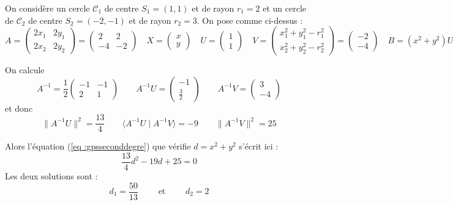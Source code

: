 \documentclass[class=report,crop=false]{standalone}
\begin{document}
\begin{exemple}
On considère un cercle $\mathcal{C}_1$ de centre $S_1 = (1,1)$ et de rayon $r_1=2$
et un cercle de $\mathcal{C}_2$ de centre $S_2 = (-2,-1)$ et de rayon $r_2=3$.
On pose comme ci-dessus :
$$
A = \begin{pmatrix}2x_1&2y_1\\2x_2&2y_2\end{pmatrix}
= \begin{pmatrix}2&2\\-4&-2\end{pmatrix}\quad
X = \begin{pmatrix}x\\y\end{pmatrix}\quad
U = \begin{pmatrix}1\\1\end{pmatrix} \quad
V = \begin{pmatrix}x_1^2 + y_1^2  - r_1^2\\x_2^2 + y_2^2  - r_2^2\end{pmatrix}
= \begin{pmatrix}-2\\-4\end{pmatrix}\quad
B = (x^2+y^2) U + V$$


On calcule 
$$A^{-1} = \frac12\begin{pmatrix}-1&-1\\2&1\end{pmatrix} \qquad
A^{-1}U = \begin{pmatrix}-1\\\frac32\end{pmatrix}\qquad
A^{-1}V = \begin{pmatrix}3\\-4\end{pmatrix}$$
et donc 
$$\|  A^{-1}  U  \|^2 = \frac{13}{4}\qquad
\langle  A^{-1}  U \mid A^{-1} V \rangle = -9\qquad
\| A^{-1} V \|^2= 25$$

Alors l'équation (\ref{eq :gpsseconddegre}) que vérifie $d=x^2+y^2$ s'écrit ici :
$$\frac{13}{4} d^2 
-19 d  + 25 = 0$$
Les deux solutions sont :
$$d_1 = \frac{50}{13} \qquad\text{ et } \qquad
d_2 = 2$$




\end{exemple}
\end{document}
